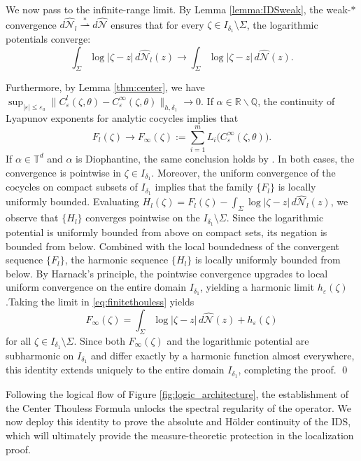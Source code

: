 \documentclass[reqno,11pt]{amsart}
\newcommand{\R}{{\mathbb R}}
\newcommand{\Q}{{\mathbb Q}}
\begin{document}
We now pass to the infinite-range limit. By Lemma \ref{lemma:IDSweak}, the weak-$*$ convergence $d\widehat{\mathcal{N}}_l \overset{*}{\rightharpoonup} d\widehat{\mathcal{N}}$ ensures that for every $\zeta \in I_{\delta_1} \setminus \Sigma$, the logarithmic potentials converge:$$\int_{\Sigma}\log|\zeta-z|\,d\widehat{\mathcal{N}}_l(z) \longrightarrow \int_{\Sigma}\log|\zeta-z|\,d\widehat{\mathcal{N}}(z).$$


Furthermore, by Lemma \ref{thm:center}, we have
$\sup_{|\varepsilon|\leq \varepsilon_a}\|C_{\varepsilon}^{l}(\zeta,\theta)-C_{\varepsilon}^{\infty}(\zeta,\theta)\|_{h,\delta_{1}}\to 0.$
If $\alpha\in \R\backslash\Q$,  the continuity of
Lyapunov exponents for analytic cocycles \cite{AJS} implies that
$$
F_l(\zeta)\rightarrow F_\infty(\zeta):=
\sum_{i=1}^{m}L_i\bigl(C_\varepsilon^\infty(\zeta,\theta)\bigr).
$$ 
If $\alpha\in\mathbb{T}^d$ and $\alpha$ is Diophantine, the same conclusion holds by
\cite{DK}. In both cases, the convergence is pointwise in $\zeta\in I_{\delta_1}$.
Moreover, the uniform convergence of the cocycles on compact subsets of
$I_{\delta_1}$ implies that the family $\{F_l\}$ is locally uniformly bounded. 
Evaluating $H_l(\zeta) = F_l(\zeta) - \int_{\Sigma}\log|\zeta-z|\,d\widehat{\mathcal{N}}_l(z)$, we observe that $\{H_l\}$ converges pointwise on the $I_{\delta_1} \setminus \Sigma$. Since the logarithmic potential is uniformly bounded from above on compact sets, its negation is bounded from below. Combined with the local boundedness of the convergent sequence $\{F_l\}$, the harmonic sequence $\{H_l\}$ is locally uniformly bounded from below. By Harnack's principle, the pointwise convergence upgrades to local uniform convergence on the entire domain $I_{\delta_1}$, yielding a harmonic limit $h_\varepsilon(\zeta)$.Taking the limit in \eqref{eq:finitethouless} yields
$$F_\infty(\zeta) = \int_{\Sigma}\log|\zeta-z|\,d\widehat{\mathcal{N}}(z) + h_\varepsilon(\zeta)$$
for all $\zeta \in I_{\delta_1} \setminus \Sigma$. Since both $F_\infty(\zeta)$ and the logarithmic potential are subharmonic on $I_{\delta_1}$ and differ exactly by a harmonic function almost everywhere, this identity extends uniquely to the entire domain $I_{\delta_1}$, completing the proof. \qed

\smallskip

Following the logical flow of Figure \ref{fig:logic_architecture}, the establishment of the Center Thouless Formula  unlocks the spectral regularity of the operator. We now deploy this  identity to prove the absolute and H\"older continuity of the IDS, which will ultimately provide the  measure-theoretic protection  in the localization proof. 
\end{document}
